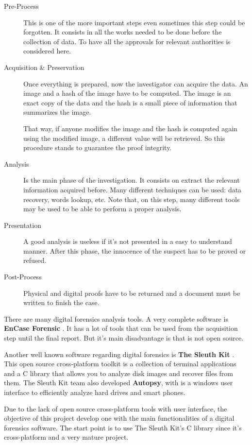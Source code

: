 \begin{description}
	\item [Pre-Process]
		This is one of the more important steps even sometimes this step 
		could be forgotten. It consists in all the works needed to be 
		done before the collection of data. To have all the approvals 
		for relevant authorities is considered here.

	\item [Acquisition \& Preservation]
		Once everything is prepared, now the investigator can acquire 
		the data. An image and a hash of the image have to be computed.
		The image is an exact copy of the data and the hash is a small
		piece of information that summarizes the image.

		That way, if anyone modifies the image and the hash is computed
		again using the modified image, a different value will be 
		retrieved. So this procedure stands to guarantee the proof 
		integrity.

	\item [Analysis]
		Is the main phase of the investigation. It consists on extract
		the relevant information acquired before. Many different 
		techniques can be used: data recovery, words lookup, etc. Note
		that, on this step, many different tools may be used to be able
		to perform a proper analysis.

	\item [Presentation]
		A good analysis is useless if it's not presented in a easy to 
		understand manner. After this phase, the innocence of the
		suspect has to be proved or refused.

	\item [Post-Process]
		Physical and digital proofs have to be returned and a document 
		must be written to finish the case.

\end{description}

There are many digital forensics analysis tools. A very complete software is 
\textbf{EnCase Forensic} \cite{encase-web}. It has a lot of tools that can be 
used from the acquisition step until the final report. But it's main 
disadvantage is that is not open source.

Another well known software regarding digital forensics is \textbf{The Sleuth
Kit} \cite{tsk-web}. This open source cross-platform toolkit is a collection 
of terminal applications and a C library that allows you to analyze disk images 
and recover files from them. The Sleuth Kit team also developed
\textbf{Autopsy}, with is a windows user interface to efficiently analyze hard 
drives and smart phones.

Due to the lack of open source cross-platform tools with user interface, the
objective of this project develop one with the main functionalities of a 
digital forensics software. The start point is to use The Sleuth Kit's C library 
since it's cross-platform and a very mature project.

